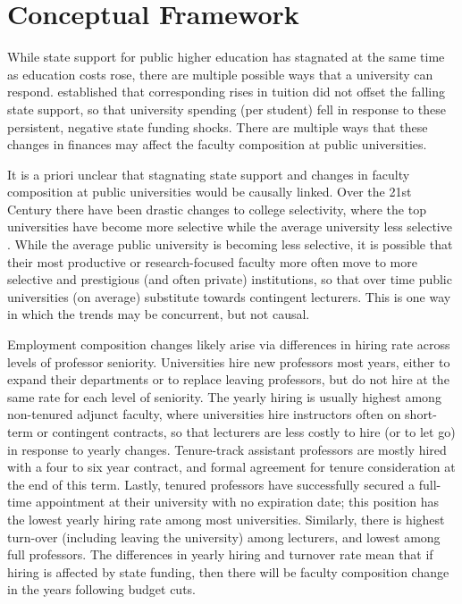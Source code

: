 \section{Conceptual Framework}
\label{sec:conceptual}

While state support for public higher education has stagnated at the same time as education costs rose, there are multiple possible ways that a university can respond.
\cite{NBERw23736} established that corresponding rises in tuition did not offset the falling state support, so that university spending (per student) fell in response to these persistent, negative state funding shocks.
There are multiple ways that these changes in finances may affect the faculty composition at public universities.

It is a priori unclear that stagnating state support and changes in faculty composition at public universities would be causally linked.
Over the 21st Century there have been drastic changes to college selectivity, where the top universities have become more selective while the average university less selective \citep{hoxby2009changing}.
While the average public university is becoming less selective, it is possible that their most productive or research-focused faculty more often move to more selective and prestigious (and often private) institutions, so that over time public universities (on average) substitute towards contingent lecturers. 
This is one way in which the trends may be concurrent, but not causal.

Employment composition changes likely arise via differences in hiring rate across levels of professor seniority.
Universities hire new professors most years, either to expand their departments or to replace leaving professors, but do not hire at the same rate for each level of seniority.
The yearly hiring is usually highest among non-tenured adjunct faculty, where universities hire instructors often on short-term or contingent contracts, so that lecturers are less costly to hire (or to let go) in response to yearly changes.
Tenure-track assistant professors are mostly hired with a four to six year contract, and formal agreement for tenure consideration at the end of this term.
Lastly, tenured professors have successfully secured a full-time appointment at their university with no expiration date; this position has the lowest yearly hiring rate among most universities.
Similarly, there is highest turn-over (including leaving the university) among lecturers, and lowest among full professors.
The differences in yearly hiring and turnover rate mean that if hiring is affected by state funding, then there will be faculty composition change in the years following budget cuts.

